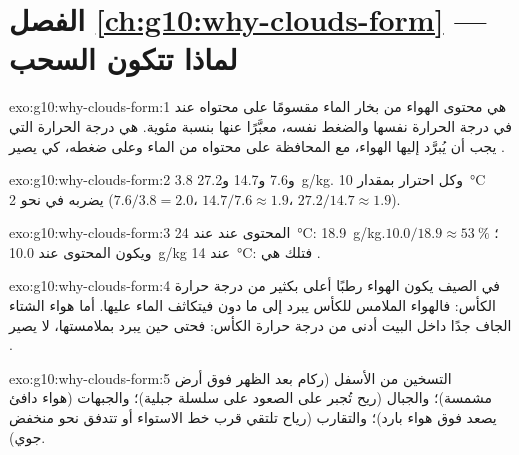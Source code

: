 \section*{الفصل \ref{ch:g10:why-clouds-form} --- لماذا تتكون السحب}

\begin{solution}{exo:g10:why-clouds-form:1}
 هي محتوى الهواء من بخار الماء مقسومًا على محتواه عند  في
درجة الحرارة نفسها والضغط نفسه، معبَّرًا عنها بنسبة مئوية.  هي درجة
الحرارة التي يجب أن يُبرَّد إليها الهواء، مع المحافظة على محتواه من الماء وعلى
ضغطه، كي يصير .
\end{solution}

\begin{solution}{exo:g10:why-clouds-form:2}
\num{3.8} و\num{7.6} و\num{14.7} و\qty{27.2}{g/kg}. وكل احترار بمقدار
\qty{10}{\degreeCelsius} يضربه في نحو 2 ($7.6/3.8 = 2.0$،
$14.7/7.6 \approx 1.9$، $27.2/14.7 \approx 1.9$).
\end{solution}

\begin{solution}{exo:g10:why-clouds-form:3}
المحتوى عند  عند \qty{24}{\degreeCelsius}: \qty{18.9}{g/kg}؛  $10.0/18.9 \approx \qty{53}{\percent}$. ويكون المحتوى عند 
\qty{10.0}{g/kg} عند \qty{14}{\degreeCelsius}: فتلك هي .
\end{solution}

\begin{solution}{exo:g10:why-clouds-form:4}
في الصيف يكون الهواء رطبًا  أعلى بكثير من درجة حرارة الكأس: فالهواء
الملامس للكأس يبرد إلى ما دون  فيتكاثف الماء عليها. أما هواء الشتاء
الجاف جدًا داخل البيت  أدنى من درجة حرارة الكأس: فحتى حين يبرد
بملامستها، لا يصير .
\end{solution}

\begin{solution}{exo:g10:why-clouds-form:5}
التسخين من الأسفل (ركام بعد الظهر فوق أرض مشمسة)؛ والجبال (ريح تُجبر على الصعود
على سلسلة جبلية)؛ والجبهات (هواء دافئ يصعد فوق هواء بارد)؛ والتقارب (رياح تلتقي
قرب خط الاستواء أو تتدفق نحو منخفض جوي).
\end{solution}

